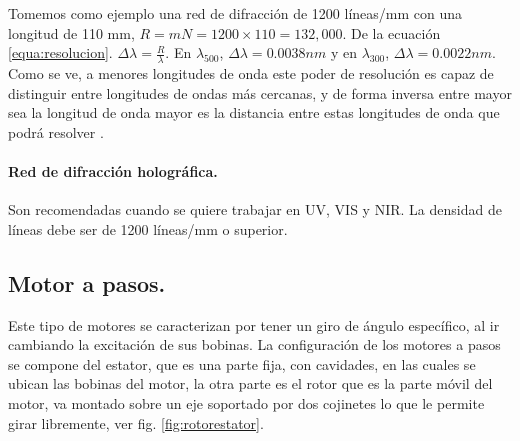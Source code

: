 Tomemos como ejemplo una red de difracción de 1200 líneas/mm con una longitud de 110 mm, $R=mN = 1200 \times 110 = 132,000$. De la ecuación \ref{equa:resolucion}. $\Delta\lambda = \frac{R}{\lambda}$. En $\lambda_{500}$, $\Delta\lambda = 0.0038nm$
y en $\lambda_{300}$, $\Delta\lambda = 0.0022nm$. Como se ve, a menores longitudes de onda este poder de resolución es capaz de distinguir entre longitudes de ondas más cercanas, y de forma inversa entre mayor sea la longitud de onda mayor es la distancia entre estas longitudes de onda que podrá resolver \cite{Gratings2008}.

\paragraph{Red de difracción holográfica.} Son recomendadas cuando se quiere trabajar en UV, VIS y NIR. La densidad de líneas debe ser de 1200 líneas/mm o superior. %





\subsection{Motor a pasos.}
Este tipo de motores se caracterizan por tener un giro de ángulo específico, al ir cambiando la excitación de sus bobinas. %
La configuración de los motores a pasos se compone del estator, que es una parte fija, con cavidades, en las cuales se ubican las bobinas del motor, la otra parte es el rotor que es la parte móvil del motor, va montado sobre un eje soportado por dos cojinetes lo que le permite girar libremente, ver fig. \ref{fig:rotorestator}. 

